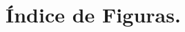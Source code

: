 \chapter*{\sloppy Índice de Figuras.}

\renewcommand{\listfigurename}{\fontsize{12}{18}\selectfont Contenido.}
\renewcommand{\cftfigleader}{\cftdotfill{\cftdotsep}}

\setlength{\cftbeforeloftitleskip}{1pt}
\setlength{\cftafterloftitleskip}{0pt}

\setlength{\cftfigindent}{0pt}

\setlength{\cftbeforefigskip}{0pt}
\renewcommand{\cftfigfont}{\normalfont}
\renewcommand{\cftfigpagefont}{\normalfont}

\renewcommand{\cftfigpresnum}{Figura~}
\renewcommand{\cftfignumwidth}{5em}

\listoffigures